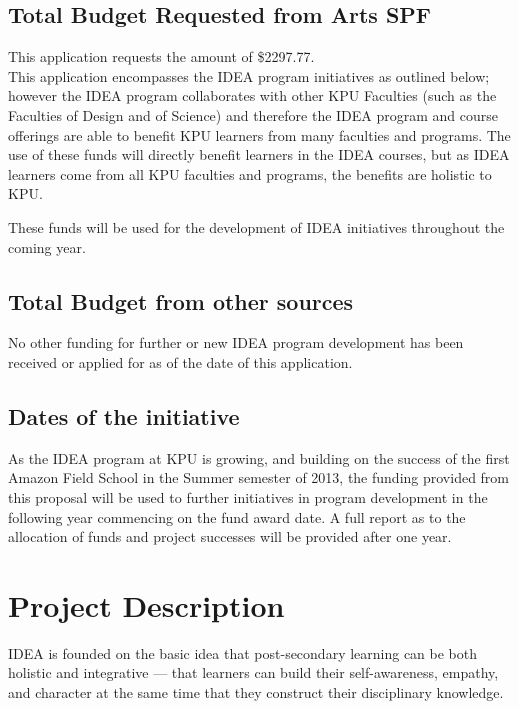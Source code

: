 \documentclass[11pt, letterpaper]{article}
\begin{document}
\subsection{Total Budget Requested from Arts SPF}

This application requests the amount of \$2297.77.\\[1em]
\noindent
This application encompasses the IDEA program initiatives as outlined
below; however the IDEA program collaborates with other KPU Faculties
(such as the Faculties of Design and of Science) and therefore the IDEA
program and course offerings are able to benefit KPU learners from many
faculties and programs. The use of these funds will directly benefit
learners in the IDEA courses, but as IDEA learners come from all KPU
faculties and programs, the benefits are holistic to KPU.

These funds will be used for the development of IDEA initiatives
throughout the coming year.

\subsection{Total Budget from other sources}

No other funding for further or new IDEA program development has been
received or applied for as of the date of this application.

\subsection{Dates of the initiative}

As the IDEA program at KPU is growing, and building on the success of
the first Amazon Field School in the Summer semester of 2013, the
funding provided from this proposal will be used to further initiatives
in program development in the following year commencing on the fund
award date. A full report as to the allocation of funds and project
successes will be provided after one year.

\section{Project Description}

IDEA is founded on the basic idea that post-secondary learning can be
both holistic and integrative --- that learners can build their
self-awareness, empathy, and character at the same time that they
construct their disciplinary knowledge.
\end{document}

